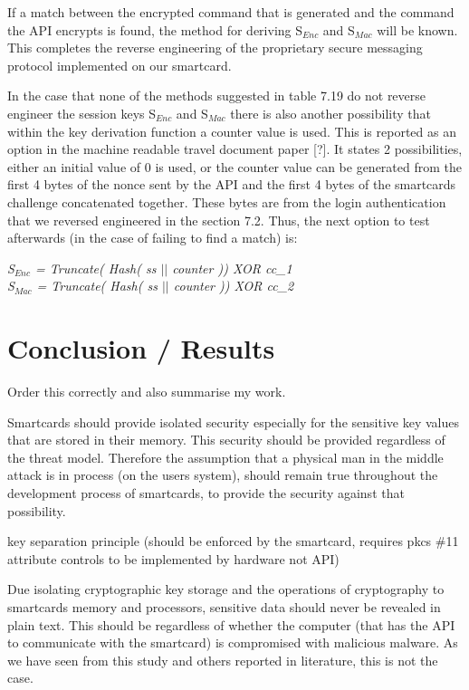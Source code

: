 \documentclass[bsc,frontabs,twoside,singlespacing,parskip,deptreport]{infthesis}     %
\begin{document}
If a match between the encrypted command that is generated and the command the API encrypts is found, the method for deriving S$_{Enc}$ and S$_{Mac}$ will be known. This completes the reverse engineering of the proprietary secure messaging protocol implemented on our smartcard. 

In the case that none of the methods suggested in table 7.19 do not reverse engineer the session keys S$_{Enc}$ and S$_{Mac}$ there is also another possibility that within the key derivation function a counter value is used. This is reported as an option in the machine readable travel document paper [?]. It states 2 possibilities, either an initial value of 0 is used, or the counter value can be generated from the first 4 bytes of the nonce sent by the API and the first 4 bytes of the smartcards challenge concatenated together. These bytes are from the login authentication that we reversed engineered in the section 7.2. Thus, the next option to test afterwards (in the case of failing to find a match) is:
\begin{center}
\textit{S$_{Enc}$ = Truncate( Hash( ss $||$ counter )) XOR cc\_1\\}
\textit{S$_{Mac}$ = Truncate( Hash( ss $||$ counter )) XOR cc\_2\\}
\end{center}

\chapter{Conclusion / Results}

Order this correctly and also summarise my work.

Smartcards should provide isolated security especially for the sensitive key values that are stored in their memory. This security should be provided regardless of the threat model. Therefore the assumption that a physical man in the middle attack is in process (on the users system), should remain true throughout the development process of smartcards, to provide the security against that possibility.

key separation principle (should be enforced by the smartcard, requires pkcs \#11 attribute controls to be implemented by hardware not API)

Due isolating cryptographic key storage and the operations of cryptography to smartcards memory and processors, sensitive data should never be revealed in plain text. This should be regardless of whether the computer (that has the API to communicate with the smartcard) is compromised with malicious malware. As we have seen from this study and others reported in literature, this is not the case.
\end{document}
